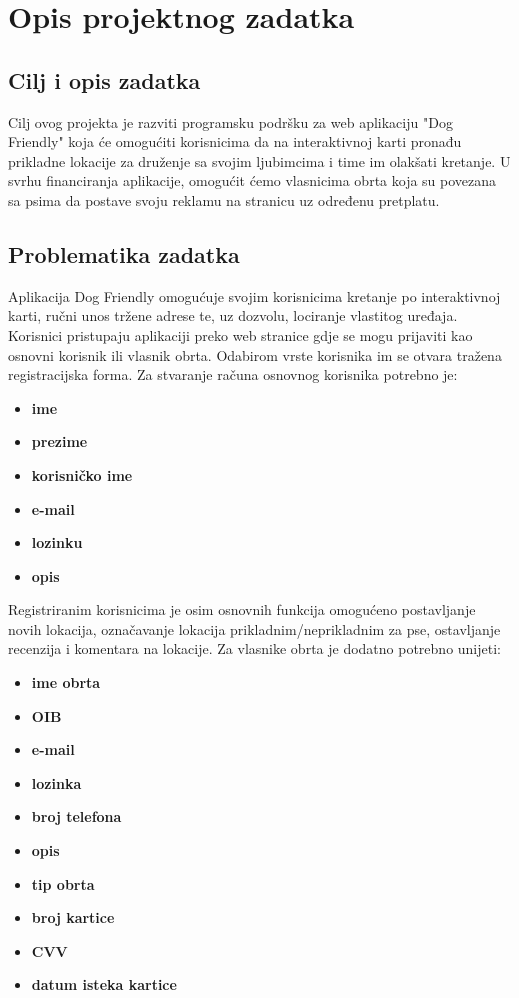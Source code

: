 \chapter{Opis projektnog zadatka}

    \section{Cilj i opis zadatka}
    Cilj ovog projekta je razviti programsku podršku za web aplikaciju "Dog Friendly" koja će omogućiti korisnicima da na interaktivnoj karti pronađu prikladne lokacije za druženje sa svojim ljubimcima i time im olakšati kretanje. U svrhu financiranja aplikacije, omogućit ćemo vlasnicima obrta koja su povezana sa psima da postave svoju reklamu na stranicu uz određenu pretplatu.
    
    \section{Problematika zadatka}
    Aplikacija Dog Friendly omogućuje svojim korisnicima kretanje po interaktivnoj karti, ručni unos tržene adrese te, uz dozvolu, lociranje vlastitog uređaja. Korisnici pristupaju aplikaciji preko web stranice gdje se mogu prijaviti kao osnovni korisnik ili vlasnik obrta. Odabirom vrste korisnika im se otvara tražena registracijska forma.
    \newline 
    Za stvaranje računa osnovnog korisnika potrebno je:
        \begin{itemize}
            \item \textbf{ime}
            \item \textbf{prezime}
			\item \textbf{korisničko ime} 
			\item \textbf{e-mail} 
			\item \textbf{lozinku}
			\item \textbf{opis}
		\end{itemize}
    Registriranim korisnicima je osim osnovnih funkcija omogućeno postavljanje novih lokacija, označavanje lokacija prikladnim/neprikladnim za pse, ostavljanje recenzija i komentara na lokacije. 
    \eject
    Za vlasnike obrta je dodatno potrebno unijeti:
    \begin{itemize}
		\item \textbf{ime obrta} 
		\item \textbf{OIB} 
		\item \textbf{e-mail}
		\item \textbf{lozinka}
		\item \textbf{broj telefona}
		\item \textbf{opis}
		\item \textbf{tip obrta}
		\item \textbf{broj kartice}
		\item \textbf{CVV}
		\item \textbf{datum isteka kartice}
	\end{itemize}

